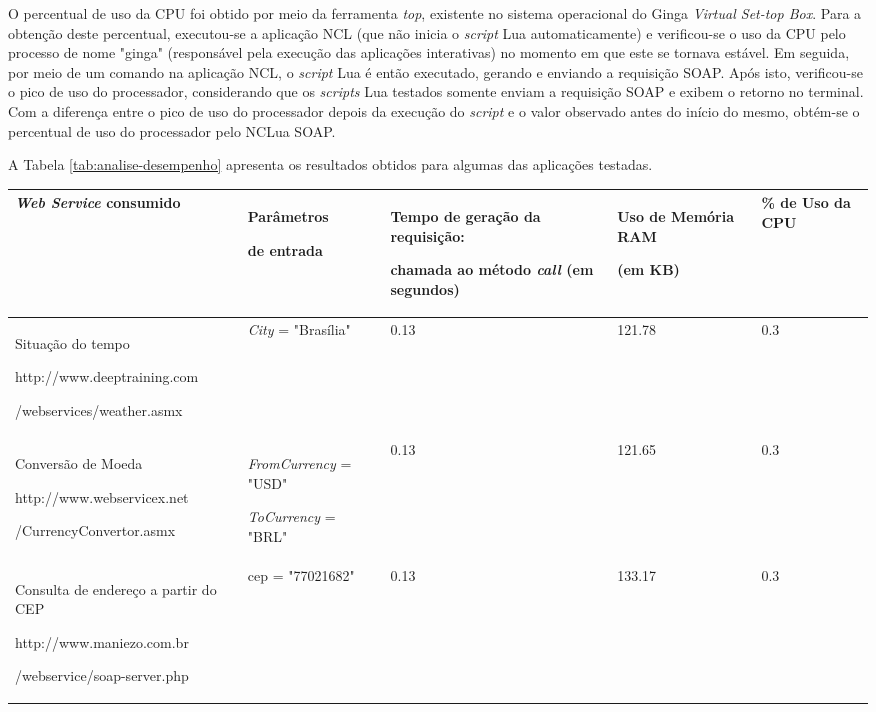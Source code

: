 O percentual de uso da CPU foi obtido por meio da ferramenta \textit{top}, existente no sistema
operacional do Ginga \textit{Virtual Set-top Box}. Para a obtenção deste percentual,
executou-se a aplicação NCL (que não inicia o \textit{script} Lua automaticamente) e 
verificou-se o uso da CPU pelo processo de nome "ginga" (responsável
pela execução das aplicações interativas) no momento em que este se tornava
estável. Em seguida, por meio de um comando na aplicação NCL,
o \textit{script} Lua é então executado, gerando e enviando a requisição SOAP.
Após isto, verificou-se o pico de uso do processador, considerando que
os \textit{scripts} Lua testados somente enviam a requisição SOAP e exibem o retorno no terminal.
Com a diferença entre o pico de uso do processador depois da execução do \textit{script}
e o valor observado antes do início do mesmo, obtém-se o percentual de uso do processador
pelo NCLua SOAP.

A Tabela \ref{tab:analise-desempenho} apresenta os resultados obtidos para algumas das aplicações testadas.

\begin{center}
\scriptsize{
	\begin{tabular}{|p{4.5cm}|p{2.8cm}|p{2.8cm}|p{1.2cm}|p{1.2cm}|} %
  \hline
		\textbf{\textit{Web Service} consumido} & 
		\textbf{Parâmetros} \par\textbf{de entrada} &
		\textbf{Tempo de geração da requisição:}\par\textbf{chamada ao método \textit{call}} \textbf{(em segundos)} & 
		\textbf{Uso de Memória RAM}\par\textbf{(em KB)} &
		\textbf{\% de Uso da CPU}\\
  \hline
		Situação do tempo\par http://www.deeptraining.com\par/webservices/weather.asmx & 
		\textit{City} = "Brasília" & 0.13 & 121.78 & 0.3 \\
  \hline
		Conversão de Moeda\par
		http://www.webservicex.net\par/CurrencyConvertor.asmx &
		\textit{FromCurrency} = "USD"\par        
    \textit{ToCurrency} = "BRL" & 
    0.13 & 121.65 & 0.3 \\  
  \hline
		Consulta de endereço a partir do CEP\par
		http://www.maniezo.com.br\par/webservice/soap-server.php &
    cep = "77021682" & 
    0.13 & 133.17 & 0.3 \\  
	\hline
	\end{tabular}
	\label{tab:analise-desempenho}
}
\end{center}

